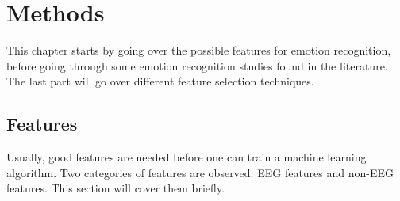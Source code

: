 \chapter{Methods}
{\samenvatting This chapter starts by going over the possible features for emotion recognition, before going through some emotion recognition studies found in the literature. The last part will go over different feature selection techniques.}

\section{Features}
\label{featuresExplained}
Usually, good features are needed before one can train a machine learning algorithm. Two categories of features are observed: EEG features and non-EEG features. This section will cover them briefly.

